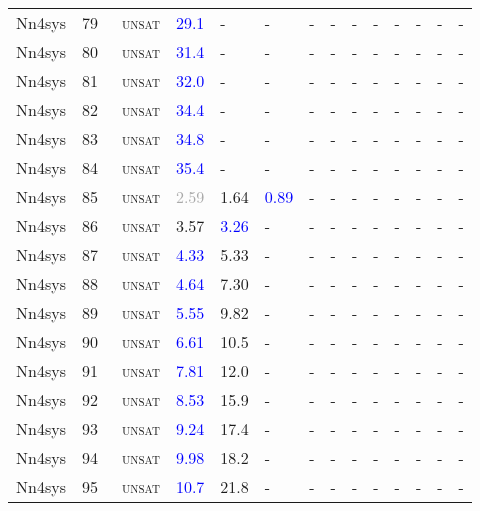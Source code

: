 \begin{center}
{\begin{longtable}{@{}llllllllllllll@{}}
Nn4sys & 79 & ~\textsc{unsat} & \textcolor{blue}{29.1} & - & - & - & - & - & - & - & - & - & - \\
Nn4sys & 80 & ~\textsc{unsat} & \textcolor{blue}{31.4} & - & - & - & - & - & - & - & - & - & - \\
Nn4sys & 81 & ~\textsc{unsat} & \textcolor{blue}{32.0} & - & - & - & - & - & - & - & - & - & - \\
Nn4sys & 82 & ~\textsc{unsat} & \textcolor{blue}{34.4} & - & - & - & - & - & - & - & - & - & - \\
Nn4sys & 83 & ~\textsc{unsat} & \textcolor{blue}{34.8} & - & - & - & - & - & - & - & - & - & - \\
Nn4sys & 84 & ~\textsc{unsat} & \textcolor{blue}{35.4} & - & - & - & - & - & - & - & - & - & - \\
Nn4sys & 85 & ~\textsc{unsat} & \textcolor{darkgray}{2.59} & \textcolor{second}{1.64} & \textcolor{blue}{0.89} & - & - & - & - & - & - & - & - \\
Nn4sys & 86 & ~\textsc{unsat} & \textcolor{second}{3.57} & \textcolor{blue}{3.26} & - & - & - & - & - & - & - & - & - \\
Nn4sys & 87 & ~\textsc{unsat} & \textcolor{blue}{4.33} & \textcolor{second}{5.33} & - & - & - & - & - & - & - & - & - \\
Nn4sys & 88 & ~\textsc{unsat} & \textcolor{blue}{4.64} & \textcolor{second}{7.30} & - & - & - & - & - & - & - & - & - \\
Nn4sys & 89 & ~\textsc{unsat} & \textcolor{blue}{5.55} & \textcolor{second}{9.82} & - & - & - & - & - & - & - & - & - \\
Nn4sys & 90 & ~\textsc{unsat} & \textcolor{blue}{6.61} & \textcolor{second}{10.5} & - & - & - & - & - & - & - & - & - \\
Nn4sys & 91 & ~\textsc{unsat} & \textcolor{blue}{7.81} & \textcolor{second}{12.0} & - & - & - & - & - & - & - & - & - \\
Nn4sys & 92 & ~\textsc{unsat} & \textcolor{blue}{8.53} & \textcolor{second}{15.9} & - & - & - & - & - & - & - & - & - \\
Nn4sys & 93 & ~\textsc{unsat} & \textcolor{blue}{9.24} & \textcolor{second}{17.4} & - & - & - & - & - & - & - & - & - \\
Nn4sys & 94 & ~\textsc{unsat} & \textcolor{blue}{9.98} & \textcolor{second}{18.2} & - & - & - & - & - & - & - & - & - \\
Nn4sys & 95 & ~\textsc{unsat} & \textcolor{blue}{10.7} & \textcolor{second}{21.8} & - & - & - & - & - & - & - & - & - \\

\end{longtable}}
\end{center}
